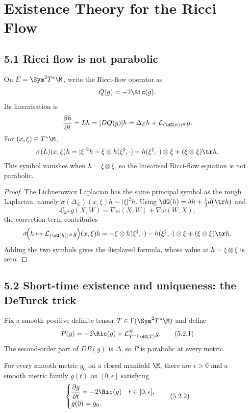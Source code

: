 \chapter{Existence Theory for the Ricci Flow}

\section*{5.1 \quad Ricci flow is not parabolic}

\begin{remark}
\label{topping-ricci-flow-linearisation-not-parabolic}
On $E=\Sym^2T^*\M$, write the Ricci-flow operator as
\[
Q(g)=-2\Ric(g).
\]
Its linearisation is
\[
\frac{\partial h}{\partial t}=Lh=[DQ(g)]h
 =\Delta_{\mathcal L}h+\mathcal L_{(\dG(h))^\#}g.
\]
For $(x,\xi)\in T^*\M$,
\[
\sigma(L)(x,\xi)h
 =|\xi|^2h-\xi\otimes h(\xi^\sharp,\cdot)
 -h(\xi^\sharp,\cdot)\otimes\xi+(\xi\otimes\xi)\tr h.
\]
This symbol vanishes when $h=\xi\otimes\xi$, so the linearised Ricci-flow
equation is not parabolic.
\end{remark}

\begin{proof}
\sketch The Lichnerowicz Laplacian has the same principal symbol as the
rough Laplacian, namely $\sigma(\Delta_{\mathcal L})(x,\xi)h=|\xi|^2h$.
Using $\dG(h)=\delta h+\frac12d(\tr h)$ and
\[
\mathcal L_{\omega^\#}g(X,W)=\nabla\omega(X,W)+\nabla\omega(W,X),
\]
the correction term contributes
\[
\sigma\!\Bigl(h\mapsto\mathcal L_{(\dG(h))^\#}g\Bigr)(x,\xi)h
 =-\xi\otimes h(\xi^\sharp,\cdot)
 -h(\xi^\sharp,\cdot)\otimes\xi+(\xi\otimes\xi)\tr h.
\]
Adding the two symbols gives the displayed formula, whose value at
$h=\xi\otimes\xi$ is zero.
\end{proof}

\section*{5.2 \quad Short-time existence and uniqueness: the DeTurck trick}

Fix a smooth positive-definite tensor
$T\in\Gamma(\Sym^2T^*\M)$ and define
\[
P(g)=-2\Ric(g)+\mathcal L_{T^{-1}\dG(T)}^{\#}g.
\tag{5.2.1}
\]
The second-order part of $DP(g)$ is $\Delta$, so $P$ is parabolic at every
metric.

\begin{theorem}
\label{topping-ricci-flow-short-time-existence}
For every smooth metric $g_0$ on a closed manifold $\M$, there are
$\epsilon>0$ and a smooth metric family $g(t)$ on $[0,\epsilon]$ satisfying
\[
\begin{cases}
\dfrac{\partial g}{\partial t}=-2\Ric(g) & t\in[0,\epsilon],\\
g(0)=g_0.
\end{cases}
\tag{5.2.2}
\]
\end{theorem}


